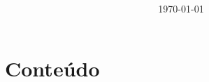 \documentclass{article}
\title{\bfseries\color{Emph}\mytitle}
\author{\myauthor}
\date{\today}
\begin{document}


\maketitle



\renewcommand{\contentsname}{} %

\section*{Conteúdo}
\begin{multicols}{2} \tableofcontents \end{multicols}

\newpage

\listoftables

\newpage
\end{document}
